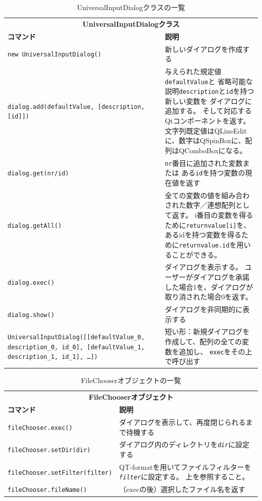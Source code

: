 \begin{table}[H]
  \centering
  \caption{UniversalInputDialogクラスの一覧}
  \begin{tabularx}{\linewidth}{XX}
    \hline
    \multicolumn{2}{c}{\textbf{UniversalInputDialogクラス}}\\
    \textbf{コマンド} & \textbf{説明}\\
    \hline
    \texttt{new UniversalInputDialog()} & 新しいダイアログを作成する\\
    \texttt{dialog.add(defaultValue, {[}description, {[}id{]}{]})}
      & 与えられた規定値\texttt{defaultValue}と
      省略可能な説明\texttt{description}と\texttt{id}を持つ新しい変数を
      ダイアログに追加する。
      そして対応するQtコンポーネントを返す。\newline
      文字列既定値はQLineEditに、数字はQSpinBoxに、配列はQComboBoxになる。\\
    \texttt{dialog.get(nr/id)}
      & \texttt{nr}番目に追加された変数または
      ある\texttt{id}を持つ変数の現在値を返す\\
    \texttt{dialog.getAll()}
      & 全ての変数の値を組み合わされた数字／連想配列として返す。
      i番目の変数を得るために\texttt{returnvalue{[}i{]}}を、
      あるidを持つ変数を得るために\texttt{returnvalue.id}を用いることができる。\\
    \texttt{dialog.exec()}
      & ダイアログを表示する。
      ユーザーがダイアログを承諾した場合1を、ダイアログが取り消された場合0を返す。\\
    \texttt{dialog.show()} & ダイアログを非同期的に表示する\\
    \texttt{UniversalInputDialog({[}{[}defaultValue\_0, description\_0, id\_0{]}, {[}defaultValue\_1, description\_1, id\_1{]}, \ldots{}{]})}
      & 短い形：新規ダイアログを作成して、配列の全ての変数を追加し、
      \texttt{exec}をその上で呼び出す\\
    \hline
  \end{tabularx}
\end{table}

\begin{table}[H]
  \centering
  \caption{FileChooserオブジェクトの一覧}
  \begin{tabularx}{\linewidth}{XX}
    \hline
    \multicolumn{2}{c}{\textbf{FileChooserオブジェクト}}\\
    \textbf{コマンド} & \textbf{説明}\\
    \hline
    \texttt{fileChooser.exec()} & ダイアログを表示して、再度閉じられるまで待機する\\
    \texttt{fileChooser.setDir(dir)}
      & ダイアログ内のディレクトリを\texttt{\emph{dir}}に設定する\\
    \texttt{fileChooser.setFilter(filter)}
      & QT-formatを用いてファイルフィルターを\texttt{\emph{filter}}に設定する。
      上を参照すること。\\
    \texttt{fileChooser.fileName()} & （execの後）選択したファイル名を返す\\
    \hline
  \end{tabularx}
\end{table}

